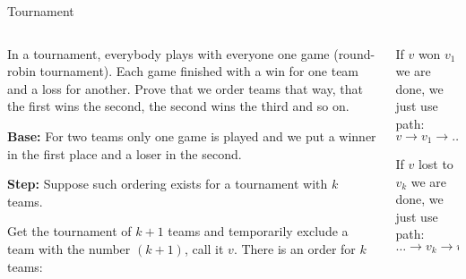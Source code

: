 \documentclass[9pt,aspectratio=169,handout]{beamer}
\begin{document}
\begin{frame}{Tournament}
  \begin{columns}[T]
    \begin{column}{0.5\textwidth}
      \begin{problem}
        In a tournament, everybody plays with everyone one game (round-robin tournament). Each game finished with a win for one team and a loss for another. Prove that we order teams that way, that the first wins the second, the second wins the third and so on.
      \end{problem}\pause

      \textbf{Base:} For two teams only one game is played and we put a winner in the first place and a loser in the second.\pause

      \textbf{Step:} Suppose such ordering exists for a tournament with $k$ teams. 

      Get the tournament of $k+1$ teams and temporarily exclude a team with the number $(k+1)$, call it $v$. There is an order for $k$ teams:
      \begin{center}
      \end{center}\pause
    \end{column}
    \begin{column}{0.5\textwidth}
      If $v$ won $v_{1}$ we are done, we just use path:
      \[ v \to v_1 \to \dots . \]\pause

      If $v$ lost to $v_{k}$ we are done, we just use path:
      \[ \dots \to v_k \to v . \]\pause


\end{column}
\end{columns}
\end{frame}
\end{document}
